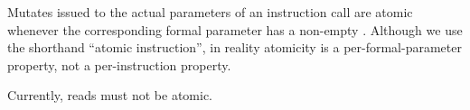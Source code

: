 
Mutates issued to the actual parameters of an instruction call are atomic whenever the corresponding formal parameter has a non-empty .
Although we use the shorthand ``atomic instruction'', in reality atomicity is a per-formal-parameter property, not a per-instruction property.

Currently, reads must not be atomic.

